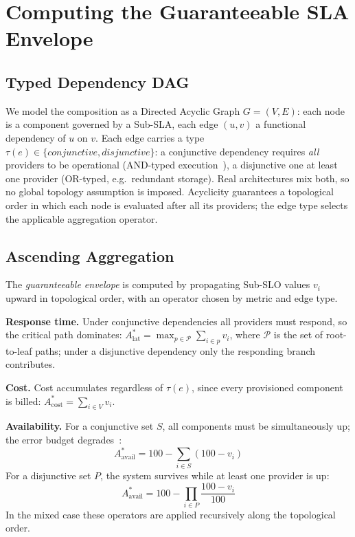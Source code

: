 \documentclass[conference]{IEEEtran}
\begin{document}
\section{Computing the Guaranteeable SLA Envelope}\label{sec:approach}

\subsection{Typed Dependency DAG}\label{sec:dag}
We model the composition as a Directed Acyclic Graph $G=(V,E)$: each node is a component governed by a Sub-SLA, each edge $(u,v)$ a functional dependency of $u$ on $v$. Each edge carries a type $\tau(e) \in \{\mathit{conjunctive}, \mathit{disjunctive}\}$: a conjunctive dependency requires \emph{all} providers to be operational (AND-typed execution~\cite{zeng2004qos}), a disjunctive one at least one provider (OR-typed, e.g.\ redundant storage). Real architectures mix both, so no global topology assumption is imposed. Acyclicity guarantees a topological order in which each node is evaluated after all its providers; the edge type selects the applicable aggregation operator.

\subsection{Ascending Aggregation}\label{sec:agg}
The \emph{guaranteeable envelope} is computed by propagating Sub-SLO values $v_i$ upward in topological order, with an operator chosen by metric and edge type.

\textbf{Response time.} Under conjunctive dependencies all providers must respond, so the critical path dominates:
$A^*_{\mathrm{lat}} = \max_{p \in \mathcal{P}} \sum_{i \in p} v_i$,
where $\mathcal{P}$ is the set of root-to-leaf paths; under a disjunctive dependency only the responding branch contributes.

\textbf{Cost.} Cost accumulates regardless of $\tau(e)$, since every provisioned component is billed: $A^*_{\mathrm{cost}} = \sum_{i \in V} v_i$.

\textbf{Availability.} For a conjunctive set $S$, all components must be simultaneously up; the error budget degrades~\cite{sloss2017calculus}:
\[
  A^*_{\mathrm{avail}} = 100 - \sum_{i \in S}(100 - v_i)
\]
For a disjunctive set $P$, the system survives while at least one provider is up:
\[
  A^*_{\mathrm{avail}} = 100 - \prod_{i \in P}\frac{100 - v_i}{100}
\]
In the mixed case these operators are applied recursively along the topological order.
\end{document}
